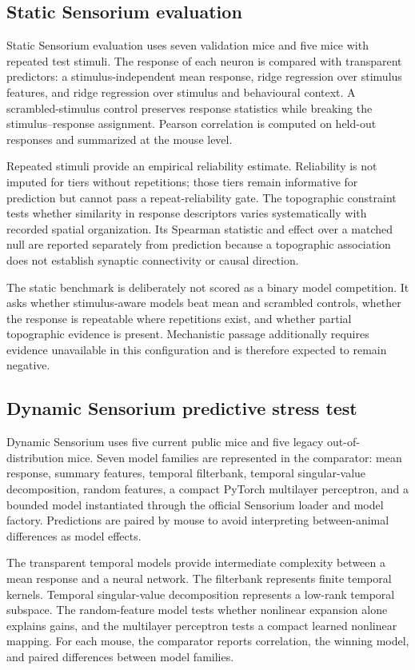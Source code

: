 \subsection{Static Sensorium evaluation}

Static Sensorium evaluation uses seven validation mice and five mice with
repeated test stimuli. The response of each neuron is compared with transparent
predictors: a stimulus-independent mean response, ridge regression over stimulus
features, and ridge regression over stimulus and behavioural context. A
scrambled-stimulus control preserves response statistics while breaking the
stimulus--response assignment. Pearson correlation is computed on held-out
responses and summarized at the mouse level.

Repeated stimuli provide an empirical reliability estimate. Reliability is not
imputed for tiers without repetitions; those tiers remain informative for
prediction but cannot pass a repeat-reliability gate. The topographic constraint
tests whether similarity in response descriptors varies systematically with
recorded spatial organization. Its Spearman statistic and effect over a matched
null are reported separately from prediction because a topographic association
does not establish synaptic connectivity or causal direction.

The static benchmark is deliberately not scored as a binary model competition.
It asks whether stimulus-aware models beat mean and scrambled controls, whether
the response is repeatable where repetitions exist, and whether partial
topographic evidence is present. Mechanistic passage additionally requires
evidence unavailable in this configuration and is therefore expected to remain
negative.

\subsection{Dynamic Sensorium predictive stress test}

Dynamic Sensorium uses five current public mice and five legacy
out-of-distribution mice. Seven model families are represented in the comparator:
mean response, summary features, temporal filterbank, temporal singular-value
decomposition, random features, a compact PyTorch multilayer perceptron, and a
bounded model instantiated through the official Sensorium loader and model
factory. Predictions are paired by mouse to avoid interpreting between-animal
differences as model effects.

The transparent temporal models provide intermediate complexity between a mean
response and a neural network. The filterbank represents finite temporal
kernels. Temporal singular-value decomposition represents a low-rank temporal
subspace. The random-feature model tests whether nonlinear expansion alone
explains gains, and the multilayer perceptron tests a compact learned nonlinear
mapping. For each mouse, the comparator reports correlation, the winning model,
and paired differences between model families.

